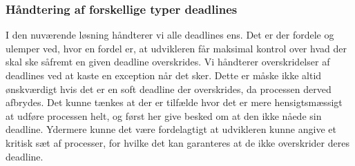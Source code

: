 \subsubsection{Håndtering af forskellige typer deadlines}
I den nuværende løsning håndterer vi alle deadlines ens. Det er der fordele og ulemper ved, hvor en fordel er, at udvikleren får maksimal kontrol over hvad der skal ske såfremt en given deadline overskrides. Vi håndterer overskridelser af deadlines ved at kaste en exception når det sker. Dette er måske ikke altid ønskværdigt hvis det er en soft deadline der overskrides, da processen derved afbrydes. Det kunne tænkes at der er tilfælde hvor det er mere hensigtsmæssigt at udføre processen helt, og først her give besked om at den ikke nåede sin deadline. Ydermere kunne det være fordelagtigt at udvikleren kunne angive et kritisk sæt af processer, for hvilke det kan garanteres at de ikke overskrider deres deadline. 






